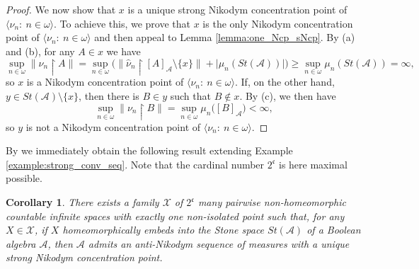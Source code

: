 \documentclass[a4paper,11pt,fleqn]{amsart}
\newtheorem{corollary}[theorem]{Corollary}
\theoremstyle{definition}
\theoremstyle{remark}
\newtheorem{remark}[theorem]{Remark}
\numberwithin{equation}{section}
\newcommand{\frakc}{\mathfrak{c}}
\newcommand{\N}{\mathbb{N}}
\newcommand{\aA}{\mathcal{A}}
\newcommand{\xX}{\mathcal{X}}
\newcommand{\rstr}{\restriction}
\newcommand{\sm}{\setminus}
\newcommand{\sub}{\subseteq}
\newcommand{\wh}{\widehat}
\newcommand{\seqn}[1]{\big\langle#1\colon\ n\io\big\rangle}
\newcommand{\clopen}[1]{\left[#1\right]}
\newcommand{\io}{\in\omega}%
\begin{document}
\begin{proof}
    We now show that $x$ is a unique strong Nikodym concentration point of $\seqn{\nu_n}$. To achieve this, we prove that $x$ is the only Nikodym concentration point of $\seqn{\nu_n}$ and then appeal to Lemma \ref{lemma:one_Ncp_sNcp}. By (a) and (b), for any $A\in x$ we have
    \[\sup_{n\io}\big\|\nu_n\rstr A\big\|=\sup_{n\io}\Big(\big\|\wh{\nu}_n\rstr\clopen{A}_\aA\sm\{x\}\big\|+\big|\mu_n(St(\aA))\big|\Big)\ge\sup_{n\io}\mu_n(St(\aA))=\infty,\]
    so $x$ is a Nikodym concentration point of $\seqn{\nu_n}$. If, on the other hand, $y\in St(\aA)\sm\{x\}$, then there is $B\in y$ such that $B\not\in x$. By (c), we then have
    \[\sup_{n\io}\big\|\nu_n\rstr B\big\|=\sup_{n\io}\mu_n\big(\clopen{B}_\aA\big)<\infty,\]
    so $y$ is not a Nikodym concentration point of $\seqn{\nu_n}$.
\end{proof}

By \cite[Corollary 7.4]{Zuc25} we immediately obtain the following result extending Example \ref{example:strong_conv_seq}. Note that the cardinal number $2^\frakc$ is here maximal possible.

\begin{corollary}\label{cor:2c_many_strong}
    There exists a family $\xX$ of $2^\frakc$ many pairwise non-homeomorphic countable infinite spaces with exactly one non-isolated point such that, for any $X\in\xX$, if $X$ homeomorphically embeds into the Stone space $St(\aA)$ of a Boolean algebra $\aA$, then $\aA$ admits an anti-Nikodym sequence of measures with a unique strong Nikodym concentration point.
\end{corollary}


\end{document}
